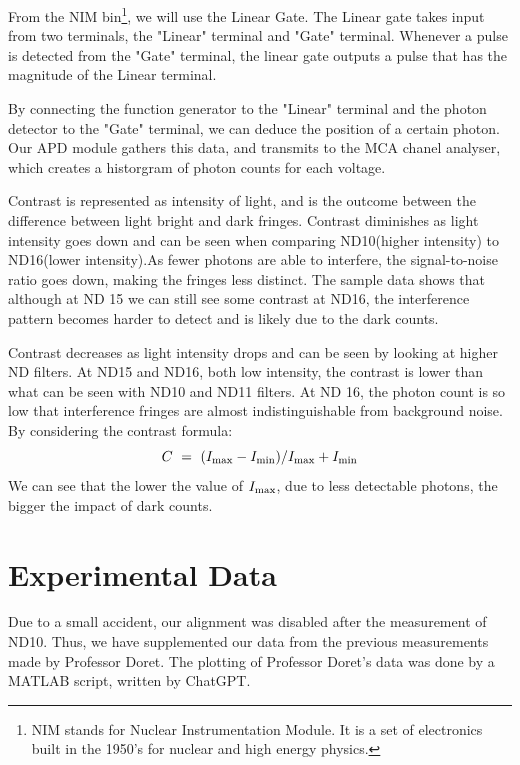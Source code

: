 \documentclass{article}
\numberwithin{equation}{section}
\begin{document}
From the NIM bin\footnote{NIM stands for Nuclear Instrumentation Module. 
It is a set of electronics built in the 1950's for nuclear and high energy physics. }, 
we will use the Linear Gate. The Linear gate takes input 
from two terminals, the "Linear" terminal and "Gate" terminal. Whenever 
a pulse is detected from the "Gate" terminal, the linear gate 
outputs a pulse that has the magnitude of the Linear terminal. 

By connecting the function generator to the "Linear" terminal and 
the photon detector to the "Gate" terminal, we can deduce the 
position of a certain photon. Our APD module gathers this data, and 
transmits to the MCA chanel analyser, which creates a historgram 
of photon counts for each voltage. 

Contrast is represented as intensity of light, and is the outcome between the difference between light bright and dark fringes. Contrast diminishes as light intensity goes down and can be seen when comparing ND10(higher intensity) to ND16(lower intensity).As fewer photons are able to interfere, the signal-to-noise ratio goes down, making the fringes less distinct. The sample data shows that although at ND 15 we can still see some contrast at ND16, the interference pattern becomes harder to detect and is likely due to the dark counts. 

Contrast decreases as light intensity drops and can be seen by looking at higher ND filters. At ND15 and ND16, both low intensity, the contrast is lower than what can be seen with ND10 and ND11 filters.
At ND 16, the photon count is so low that interference fringes are almost indistinguishable from background noise.
By considering the contrast formula:
\[
C \ = \  (I_{\rm max}-I_{\rm min})/I_{\rm max}+I_{\rm min}
\]
We can see that the lower the value of $I_{\rm max}$, due to less detectable photons, the bigger the impact of dark counts. 


\section{Experimental Data}
Due to a small accident, our alignment was disabled 
after the measurement of ND10. Thus, we have supplemented 
our data from the previous measurements made by
Professor Doret. The plotting of Professor Doret's data was done 
by a MATLAB script, written by ChatGPT. 
\end{document}
